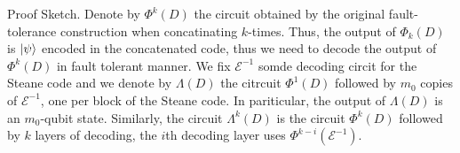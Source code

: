 \documentclass{beamer}
\begin{document}
\begin{frame}
  \begin{block}{Proof Sketch.}
    Denote by $\Phi^{k}(D)$ the circuit obtained by the original fault-tolerance construction when concatinating $k$-times. Thus, the output of $\Phi_{k}(D)$ is $\ket{\psi}$ encoded in the concatenated code, thus we need to decode the output of $\Phi^{k}(D)$ in fault tolerant manner. 
    We fix $\mathcal{E}^{-1}$ somde decoding circit for the Steane code and we denote by $\Lambda(D)$ the citrcuit $\Phi^{1}(D)$ followed by $m_{0}$ copies of $\mathcal{E}^{-1}$, one per block of the Steane code. In pariticular, the output of $\Lambda\left( D \right)$ is an $m_{0}$-qubit state. Similarly, the circuit $\Lambda^{k}(D)$ is the circuit $\Phi^{k}(D)$ followed by $k$ layers of decoding, the $i$th decoding layer uses $\Phi^{k-i}\left( \mathcal{E}^{-1}  \right)$. 
  \end{block}
\end{frame}


\begin{frame}



\end{frame}
\end{document}
